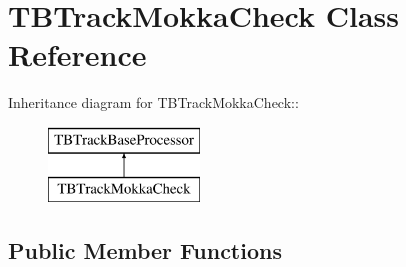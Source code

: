 \section{TBTrackMokkaCheck Class Reference}
\label{classTBTrackMokkaCheck}
Inheritance diagram for TBTrackMokkaCheck::\begin{figure}[H]
\begin{center}
\leavevmode
\includegraphics[height=2cm]{classTBTrackMokkaCheck}
\end{center}
\end{figure}
\subsection*{Public Member Functions}
